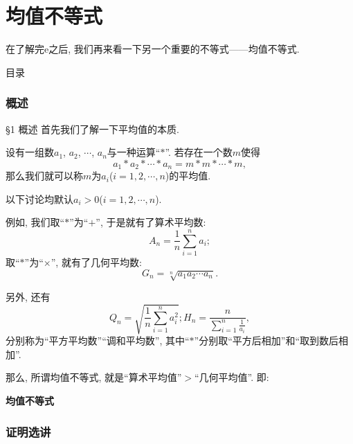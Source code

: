 \documentclass[serif]{beamer}
\begin{document}
\part{均值不等式}

\begin{frame}
	\partpage
	\noindent\begin{center}
		\kaishu 在了解完$\mathrm{e}$之后, 我们再来看一下另一个重要的不等式——均值不等式.
	\end{center}
\end{frame}

\begin{frame}{目录}
	\tableofcontents
\end{frame}

\section{\heiti 概述}

\begin{frame}{\S1 概述}
	首先我们了解一下平均值的本质.\par
	设有一组数$a_1$, $a_2$, $\cdots$, $a_n$与一种运算“$\ast$”. 若存在一个数$m$使得
	\[a_1\ast a_2\ast\cdots\ast a_n=m\ast m\ast\cdots\ast m,\]
	那么我们就可以称$m$为$a_i$($i=1,2,\cdots,n$)的平均值.
\end{frame}

\begin{frame}
	以下讨论均默认$a_i>0$($i=1,2,\cdots,n$).\par
	例如, 我们取“$\ast$”为“$+$”, 于是就有了算术平均数:
	\[A_n=\frac{1}{n}\sum\limits_{i=1}^n{a_i}; \]
	取“$\ast$”为“$\times$”, 就有了几何平均数:
	\[G_n=\sqrt[n]{a_1a_2\cdots a_n}.\]\par
	另外, 还有
	\[Q_n=\sqrt{\frac{1}{n}\sum\limits_{i=1}^n{a_i^2}}; H_n=\frac{n}{\sum\limits_{i=1}^n{\frac{1}{a_i}}},\]
	分别称为“平方平均数”“调和平均数”, 其中“$\ast$”分别取“平方后相加”和“取到数后相加”.
\end{frame}

\begin{frame}
	那么, 所谓均值不等式, 就是“算术平均值”$>$“几何平均值”. 即:\par 
	\textbf{均值不等式}
\end{frame}

\section{\heiti 证明选讲}
\end{document}

